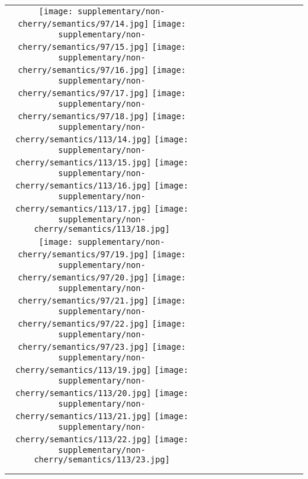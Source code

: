 \begin{figure*}[tb!]
{\begin{tabular}{c c c c c c c c c c c c }
\tabularnewline
  \texttt{[image: supplementary/non-cherry/semantics/97/14.jpg]}
  \texttt{[image: supplementary/non-cherry/semantics/97/15.jpg]}
  \texttt{[image: supplementary/non-cherry/semantics/97/16.jpg]}
  \texttt{[image: supplementary/non-cherry/semantics/97/17.jpg]}
  \texttt{[image: supplementary/non-cherry/semantics/97/18.jpg]}
    \hspace{5mm}
  \texttt{[image: supplementary/non-cherry/semantics/113/14.jpg]}
  \texttt{[image: supplementary/non-cherry/semantics/113/15.jpg]}
  \texttt{[image: supplementary/non-cherry/semantics/113/16.jpg]}
  \texttt{[image: supplementary/non-cherry/semantics/113/17.jpg]}
  \texttt{[image: supplementary/non-cherry/semantics/113/18.jpg]}

\tabularnewline
  \texttt{[image: supplementary/non-cherry/semantics/97/19.jpg]}
  \texttt{[image: supplementary/non-cherry/semantics/97/20.jpg]}
  \texttt{[image: supplementary/non-cherry/semantics/97/21.jpg]}
  \texttt{[image: supplementary/non-cherry/semantics/97/22.jpg]}
  \texttt{[image: supplementary/non-cherry/semantics/97/23.jpg]}
    \hspace{5mm}
  \texttt{[image: supplementary/non-cherry/semantics/113/19.jpg]}
  \texttt{[image: supplementary/non-cherry/semantics/113/20.jpg]}
  \texttt{[image: supplementary/non-cherry/semantics/113/21.jpg]}
  \texttt{[image: supplementary/non-cherry/semantics/113/22.jpg]}
  \texttt{[image: supplementary/non-cherry/semantics/113/23.jpg]}
    \tabularnewline

 \hspace{0.5mm}
  \tabularnewline
\vspace{2mm}
\vspace{-2\baselineskip}
\end{tabular}}
\vspace{-0.8cm}
\hspace{20pt}
\label{fig:sup1v}
\vspace{-8mm}
\end{figure*}%